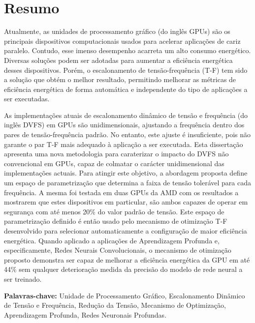 
\section*{Resumo}


Atualmente, as unidades de processamento gráfico (do inglês GPUs) são os principais dispositivos computacionais usados para acelerar aplicações de cariz paralelo. Contudo, esse imenso desempenho acarreta um alto consumo energético. Diversas soluções podem ser adotadas para aumentar a eficiência energética desses dispositivos. Porém, o escalonamento de tensão-frequência (T-F) tem sido a solução que obtém o melhor resultado, permitindo melhorar as métricas de eficiência energética de forma automática e independente do tipo de aplicações a ser executadas. 

As implementações atuais de escalonamento dinâmico de tensão e frequência (do inglês DVFS) em GPUs são unidimensionais, ajustando a frequência dentro dos pares de tensão-frequência padrão. No entanto, este ajuste é insuficiente, pois não garante o par T-F mais adequado à aplicação a ser executada. Esta dissertação apresenta uma nova metodologia para caraterizar o impacto do DVFS não convencional em GPUs, capaz de colmatar o carácter unidimensional das implementações actuais. Para atingir este objetivo, a abordagem proposta define um espaço de parametrização que determina a faixa de tensão tolerável para cada frequência. A mesma foi testada em duas GPUs da AMD com os resultados a mostrarem que estes dispositivos em particular, são ambos capazes de operar em segurança com até menos 20\% do valor padrão de tensão.
Este espaço de parametrização definido é então usado pelo mecanismo de otimização T-F desenvolvido para selecionar automaticamente a configuração de maior eficiência energética. Quando aplicado a aplicações de Aprendizagem Profunda e, especificamente, Redes Neurais Convolucionais, o mecanismo de otimização proposto demonstra ser capaz de melhorar a eficiência energética da GPU em até 44\% sem qualquer deterioração medida da precisão do modelo de rede neural a ser treinado.

\vfill

\textbf{\Large Palavras-chave:} Unidade de Processamento Gráfico, Escalonamento Dinâmico de Tensão e Frequência, Redução da Tensão, Mecanismo de Optimização, Aprendizagem Profunda, Redes Neuronais Profundas.
